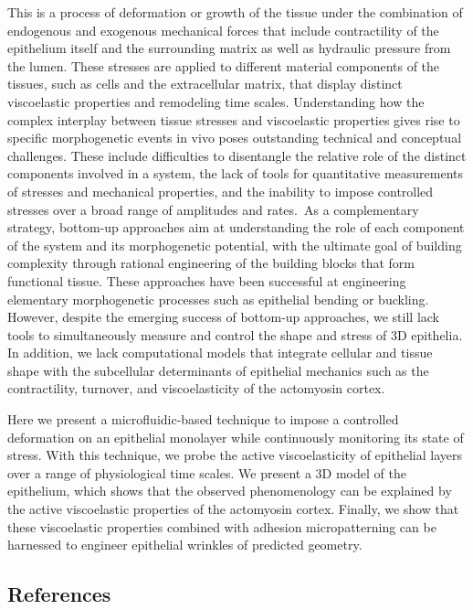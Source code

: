 \documentclass[
]{article}
\begin{document}
This is a process of deformation or growth of the tissue under the
combination of endogenous and exogenous mechanical forces that include
contractility of the epithelium itself and the surrounding matrix as
well as hydraulic pressure from the lumen. These stresses are applied to
different material components of the tissues, such as cells and the
extracellular matrix, that display distinct viscoelastic properties and
remodeling time scales. Understanding how the complex interplay between
tissue stresses and viscoelastic properties gives rise to specific
morphogenetic events in vivo poses outstanding technical and conceptual
challenges. These include difficulties to disentangle the relative role
of the distinct components involved in a system, the lack of tools for
quantitative measurements of stresses and mechanical properties, and the
inability to impose controlled stresses over a broad range of amplitudes
and rates.~As a complementary strategy, bottom-up approaches aim at
understanding the role of each component of the system and its
morphogenetic potential, with the ultimate goal of building complexity
through rational engineering of the building blocks that form functional
tissue. These approaches have been successful at engineering elementary
morphogenetic processes such as epithelial bending or buckling. However,
despite the emerging success of bottom-up approaches, we still lack
tools to simultaneously measure and control the shape and stress of 3D
epithelia. In addition, we lack computational models that integrate
cellular and tissue shape with the subcellular determinants of
epithelial mechanics such as the contractility, turnover, and
viscoelasticity of the actomyosin cortex.

Here we present a microfluidic-based technique to impose a controlled
deformation on an epithelial monolayer while continuously monitoring its
state of stress. With this technique, we probe the active
viscoelasticity of epithelial layers over a range of physiological time
scales. We present a 3D model of the epithelium, which shows that the
observed phenomenology can be explained by the active viscoelastic
properties of the actomyosin cortex. Finally, we show that these
viscoelastic properties combined with adhesion micropatterning can be
harnessed to engineer epithelial wrinkles of predicted geometry.

\hypertarget{references}{%
\subsection{References}\label{references}}
\end{document}
